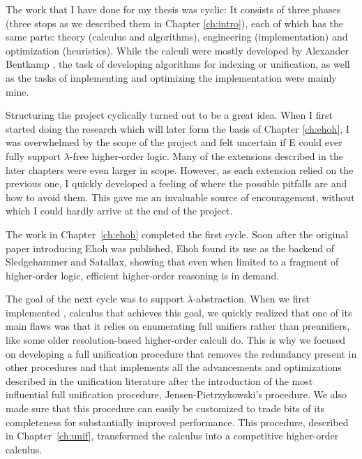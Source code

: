 The work that I have done for my thesis
was cyclic: It consists of three phases (three stops as we described them in
Chapter \ref{ch:intro}), each of which has the same parts: theory (calculus and
algorithms), engineering (implementation) and optimization (heuristics). While
the calculi were mostly developed by Alexander Bentkamp
\cite{bbcw-21-lfho,bbtvw-21-sup-lam,bbtv-21-full-ho-sup}, the task of developing
algorithms for indexing or unification, as well as the tasks of implementing and
optimizing the implementation were mainly mine.

Structuring the project cyclically turned out to be a great idea. When I first
started doing the research which will later form the basis of Chapter
\ref{ch:ehoh}, I was overwhelmed by the scope of the project and felt uncertain
if E could ever fully support $\lambda$-free higher-order logic. Many of the
extensions described in the  later chapters were even larger in scope. However,
as each extension relied on the previous one, I quickly developed a feeling of
where the possible pitfalls are and how to avoid them. This gave me an
invaluable source of encouragement, without which I could hardly arrive at the
end of the project.

The work in Chapter~\ref{ch:ehoh} completed the first cycle. Soon after the
original paper introducing Ehoh \cite{vbss-19-ehoh1} was published, Ehoh found
its use as the backend of Sledgehammer and Satallax, showing that even when
limited to a fragment of higher-order logic, efficient higher-order reasoning is
in demand.

The goal of the next cycle was to support $\lambda$-abstraction. When we first
implemented \lsup{}, calculus that achieves this goal, we quickly realized that
one of its main flaws was that it relies on enumerating full unifiers rather
than preunifiers, like some older resolution-based higher-order calculi do. This
is why we focused on developing a full unification procedure that removes the
redundancy present in other procedures and that implements all the advancements
and optimizations described in the unification literature after the introduction
of the most influential full unification procedure, Jensen-Pietrzykowski's
procedure. We also made sure that this procedure can easily be customized to
trade bits of its completeness for substantially improved performance. This
procedure, described in Chapter~\ref{ch:unif}, transformed the \lsup{} calculus
into a competitive higher-order calculus.

